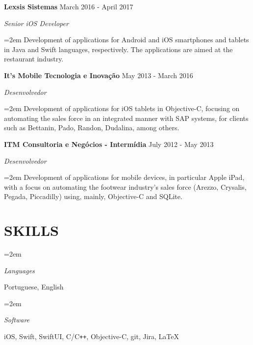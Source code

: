 \documentclass[paper=a4,fontsize=11pt]{scrartcl} %
\newlength{\spacebox}
\newcommand{\sepspace}{\vspace*{1em}}		%
\newcommand{\NewPart}[1]{\section*{\uppercase{#1}}}
\newcommand{\PersonalEntry}[2]{
		\noindent\hangindent=2em\hangafter=0 %
		\parbox{\spacebox}{        %
		\textit{#1}}		       %
		\hspace{1.5em} #2 \par}    %
\newcommand{\SkillsEntry}[2]{      %
		\noindent\hangindent=2em\hangafter=0 %
		\parbox{\spacebox}{        %
		\textit{#1}}			   %
		\hspace{1.5em} #2 \par}    %
\newcommand{\EducationEntry}[4]{
		\noindent \textbf{#1} \hfill      %
        #2 \par
		\noindent \textit{#3} \par        %
		\noindent\hangindent=2em\hangafter=0 \small #4 %
		\normalsize \par}
\newcommand{\WorkEntry}[4]{				  %
		\noindent \textbf{#1} \hfill      %
        #2 \par
		\noindent \textit{#3} \par        %
		\noindent\hangindent=2em\hangafter=0 \small #4 %
		\normalsize \par}
\begin{document}

\sepspace
\sepspace

\WorkEntry
  {Lexsis Sistemas}
  {March 2016 - April 2017}
  {Senior iOS Developer}
  {Development of applications for Android and iOS smartphones and tablets in Java and Swift languages, respectively. The applications are aimed at the restaurant industry.}


\sepspace
\sepspace

\WorkEntry
  {It’s Mobile Tecnologia e Inovação}
  {May 2013 - March 2016}
  {Desenvolvedor}
  {Development of applications for iOS tablets in Objective-C, focusing on automating the sales force in an integrated manner with SAP systems, for clients such as Bettanin, Pado, Randon, Dudalina, among others.}


\sepspace
\sepspace


\WorkEntry
  {ITM Consultoria e Negócios - Intermídia}
  {July 2012 - May 2013}
  {Desenvolvedor}
  {Development of applications for mobile devices, in particular Apple iPad, with a focus on automating the footwear industry's sales force (Arezzo, Crysalis, Pegada, Piccadilly) using, mainly, Objective-C and SQLite.}



\NewPart{Skills}{}

\SkillsEntry{Languages}{Portuguese, English}

\SkillsEntry{Software}{iOS, Swift, SwiftUI, C/C\texttt{++}, Objective-C, git, Jira, \LaTeX}


\end{document}
